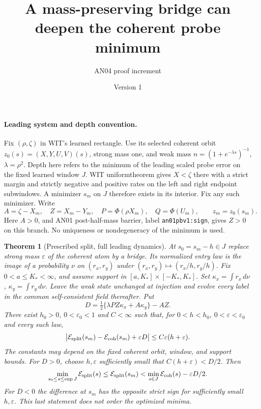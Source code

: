 \documentclass[11pt]{article}
\title{A mass-preserving bridge can deepen the coherent probe minimum}
\author{AN04 proof increment}\date{Version 1}
\newtheorem{theorem}{Theorem}
\newcommand{\EE}{\mathcal E}
\newcommand{\dd}{\,d}
\begin{document}
\maketitle

\paragraph{Leading system and depth convention.}
Fix $(\rho,\zeta)$ in WIT's learned rectangle. Use its selected
coherent orbit $z_0(s)=(X,Y,U,V)(s)$, strong mass one, and weak
mass $n=(1+e^{-\lambda s})^{-1}$, $\lambda=\rho^2$.
Depth here refers to the minimum of the leading scaled probe error on
the fixed learned window $J$. WIT uniformtheorem gives $X<\zeta$
there with a strict margin and strictly negative and positive rates
on the left and right endpoint subwindows. A minimizer $s_m$ on $J$
therefore exists in its interior. Fix any such minimizer. Write
\[
 A=\zeta-X_m,\quad Z=X_m-Y_m,\quad
 P=\Phi(\rho X_m),\quad Q=\Phi(U_m),
 \qquad z_m=z_0(s_m).
\]
Here $A>0$, and AN01 post-half-mass barrier, label
\texttt{an01pbv1:sign}, gives $Z>0$ on this branch.
No uniqueness or nondegeneracy of the minimum is used.

\begin{theorem}[Prescribed split, full leading dynamics]\label{an04mpbv1:depth}
At $s_0=s_m-h\in J$ replace strong mass $\varepsilon$ of the coherent
atom by a bridge. Its normalized entry law is the image of a probability
$\nu$ on $(r_x,r_y)$ under $(r_x,r_y)\mapsto(r_x/h,r_y/h)$.
Fix $0<a\le K_*<\infty$, and assume support in
$[a,K_*]\times[-K_*,K_*]$. Set
$\kappa_x=\int r_x\dd\nu$, $\kappa_y=\int r_y\dd\nu$.
Leave the weak state unchanged at injection and evolve every label
in the common self-consistent field thereafter. Put
\[
 D=\tfrac12\{\lambda P Z\kappa_x+A\kappa_y\}-AZ .
\]
There exist $h_0>0$, $0<\varepsilon_0<1$ and $C<\infty$ such that,
for $0<h<h_0$, $0<\varepsilon<\varepsilon_0$ and every such law,
\begin{equation}\label{an04mpbv1:estimate}
 \big|\EE_{\rm split}(s_m)-\EE_{\rm coh}(s_m)+\varepsilon D\big|
 \le C\varepsilon(h+\varepsilon).
\end{equation}
The constants may depend on the fixed coherent orbit, window, and
support bounds. For $D>0$, choose $h,\varepsilon$ sufficiently small
that $C(h+\varepsilon)<D/2$. Then
\[
 \min_{s_0\le s\le\sup J}\EE_{\rm split}(s)
 \le\EE_{\rm split}(s_m)
 <\min_{s\in J}\EE_{\rm coh}(s)-\varepsilon D/2 .
\]
For $D<0$ the difference at $s_m$ has the opposite strict sign
for sufficiently small $h,\varepsilon$. This last statement does not
order the optimized minima.
\end{theorem}
\end{document}
